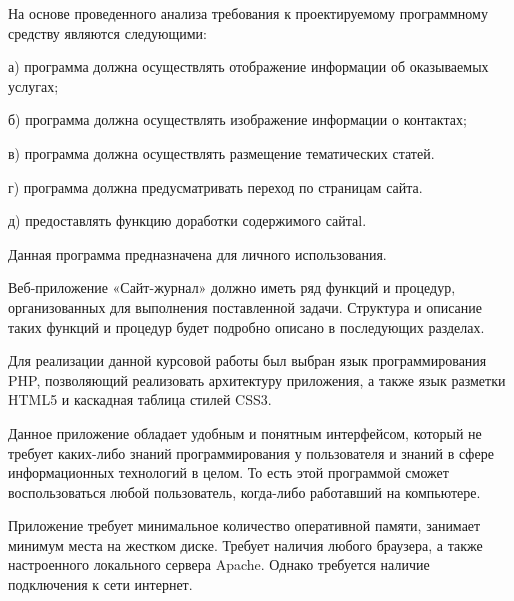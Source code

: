 \hspace{1.25cm}На основе проведенного анализа требования к проектируемому программному средству являются следующими:

а)	программа должна осуществлять отображение информации об оказываемых услугах;

б)	программа должна осуществлять изображение информации о контактах;

в)	программа должна осуществлять  размещение тематических статей.

г)	программа должна предусматривать переход по страницам сайта.

д)	предоставлять функцию доработки содержимого сайтаl.

Данная программа предназначена для личного использования.  

Веб-приложение «Сайт-журнал» должно иметь ряд функций и процедур, организованных для выполнения поставленной задачи. Структура и описание таких функций и процедур будет подробно описано в последующих разделах.

Для реализации данной курсовой работы был выбран язык программирования PHP, позволяющий реализовать архитектуру приложения, а также язык разметки HTML5 и каскадная таблица стилей CSS3.

 Данное приложение обладает удобным и понятным интерфейсом, который не требует каких-либо знаний программирования у пользователя и знаний в сфере информационных технологий в целом. То есть этой программой сможет воспользоваться любой пользователь, когда-либо работавший на компьютере. 
 
 Приложение требует минимальное количество оперативной памяти, занимает минимум места на жестком диске. Требует наличия любого браузера, а также настроенного локального сервера Apache. Однако требуется наличие подключения к сети интернет.